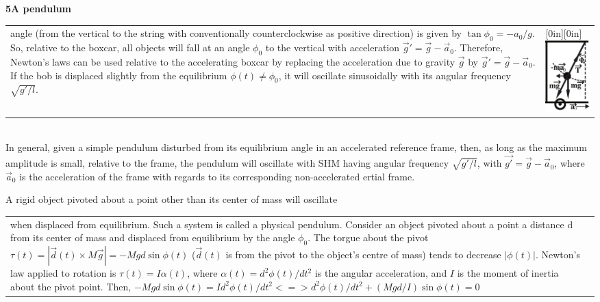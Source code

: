 \documentclass[a4paper,12pt,oneside]{report}
\newenvironment{tree}[4]{
\begin{list}{#1}{\parskip=0in \topsep=0in \itemsep=0in \parsep=0in \partopsep=0in \leftmargin=#2 \rightmargin=#3 \itemindent=#4 \listparindent=\itemindent}
}{\end{list}}
\newenvironment{ssection}[5]{
\phantom{#1}\textbf{#2\space#3}
\begin{tree}{#4}{0in}{0in}{#5}
}{\end{tree}}
\begin{document}
\begin{ssection}{\space}{5}{A pendulum}{\textbullet}{\parindent}
\begin{tabular}{p{}p{}}
angle (from the vertical to the string with conventionally counterclockwise as positive direction) is given by $\tan\phi_{0}=-a_{0}/g$. So, relative to the boxcar, all objects will fall at an angle $\phi_{0}$ to the vertical with acceleration $\vec{g}'=\vec{g}-\vec{a}_{0}$. Therefore, Newton's laws can be used relative to the accelerating boxcar by replacing the acceleration due to gravity $\vec{g}$ by $\vec{g}'=\vec{g}-\vec{a}_{0}$. If the bob is displaced slightly from the equilibrium $\phi(t)\neq\phi_{0}$, it will oscillate sinusoidally with its angular frequency $\sqrt{g'/l}$.
&\raisebox{-84pt}[0in][0in]{\includegraphics[scale=0.85]{figures/14Dec1.pdf}}
\end{tabular}\\
\indent In general, given a simple pendulum disturbed from its equilibrium angle in an accelerated reference frame, then, as long as the maximum amplitude is small, relative to the frame, the pendulum will oscillate with SHM having angular frequency $\sqrt{g'/l}$, with $\vec{g'}=\vec{g}-\vec{a}_{0}$, where $\vec{a}_{0}$ is the acceleration of the frame with regards to its corresponding non-accelerated ertial frame.
\item A rigid object pivoted about a point other than its center of mass will oscillate\\
\begin{tabular}{p{}p{}}
when displaced from equilibrium. Such a system is called a physical pendulum.\newline
Consider an object pivoted about a point a distance d from its center of mass and displaced from equilibrium by the angle $\phi_{0}$. The torgue about the pivot $\tau(t)=|\vec{d}(t)\times M\vec{g}|= -Mgd\sin\phi(t)$ ($\vec{d}(t)$ is from the pivot to the object's centre of mass) tends to decrease $|\phi(t)|$. Newton's law applied to rotation is $\tau(t)=I\alpha(t)$, where $\alpha(t)=d^{2}\phi(t)/dt^{2}$ is the angular acceleration, and $I$ is the moment of inertia about the pivot point. Then, $-Mgd\sin\phi(t)=Id^{2}\phi(t)/dt^{2}<=>d^{2}\phi(t)/dt^{2}+(Mgd/I)\sin\phi(t)=0$

\end{tabular}
\end{ssection}
\end{document}
